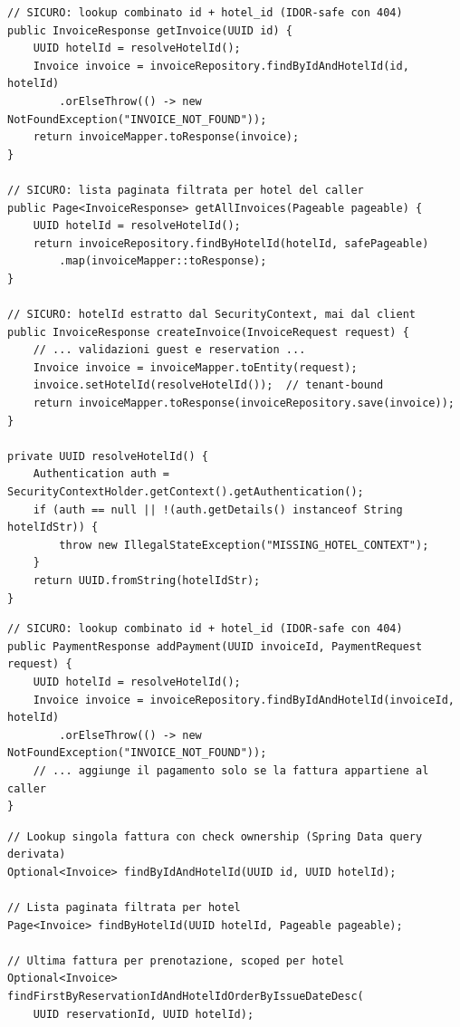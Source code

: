 ﻿\documentclass[a4paper,12pt]{report}
\begin{document}
\begin{securebox}[title={Codice Sicuro --- InvoiceServiceImpl.java (fix)}]
\begin{lstlisting}[style=java]
// SICURO: lookup combinato id + hotel_id (IDOR-safe con 404)
public InvoiceResponse getInvoice(UUID id) {
    UUID hotelId = resolveHotelId();
    Invoice invoice = invoiceRepository.findByIdAndHotelId(id, hotelId)
        .orElseThrow(() -> new NotFoundException("INVOICE_NOT_FOUND"));
    return invoiceMapper.toResponse(invoice);
}

// SICURO: lista paginata filtrata per hotel del caller
public Page<InvoiceResponse> getAllInvoices(Pageable pageable) {
    UUID hotelId = resolveHotelId();
    return invoiceRepository.findByHotelId(hotelId, safePageable)
        .map(invoiceMapper::toResponse);
}

// SICURO: hotelId estratto dal SecurityContext, mai dal client
public InvoiceResponse createInvoice(InvoiceRequest request) {
    // ... validazioni guest e reservation ...
    Invoice invoice = invoiceMapper.toEntity(request);
    invoice.setHotelId(resolveHotelId());  // tenant-bound
    return invoiceMapper.toResponse(invoiceRepository.save(invoice));
}

private UUID resolveHotelId() {
    Authentication auth = SecurityContextHolder.getContext().getAuthentication();
    if (auth == null || !(auth.getDetails() instanceof String hotelIdStr)) {
        throw new IllegalStateException("MISSING_HOTEL_CONTEXT");
    }
    return UUID.fromString(hotelIdStr);
}
\end{lstlisting}
\end{securebox}

\begin{securebox}[title={Codice Sicuro --- PaymentServiceImpl.java (fix)}]
\begin{lstlisting}[style=java]
// SICURO: lookup combinato id + hotel_id (IDOR-safe con 404)
public PaymentResponse addPayment(UUID invoiceId, PaymentRequest request) {
    UUID hotelId = resolveHotelId();
    Invoice invoice = invoiceRepository.findByIdAndHotelId(invoiceId, hotelId)
        .orElseThrow(() -> new NotFoundException("INVOICE_NOT_FOUND"));
    // ... aggiunge il pagamento solo se la fattura appartiene al caller
}
\end{lstlisting}
\end{securebox}

\begin{securebox}[title={InvoiceRepository.java --- metodi hotel-scoped}]
\begin{lstlisting}[style=java]
// Lookup singola fattura con check ownership (Spring Data query derivata)
Optional<Invoice> findByIdAndHotelId(UUID id, UUID hotelId);

// Lista paginata filtrata per hotel
Page<Invoice> findByHotelId(UUID hotelId, Pageable pageable);

// Ultima fattura per prenotazione, scoped per hotel
Optional<Invoice> findFirstByReservationIdAndHotelIdOrderByIssueDateDesc(
    UUID reservationId, UUID hotelId);
\end{lstlisting}
\end{securebox}
\end{document}
